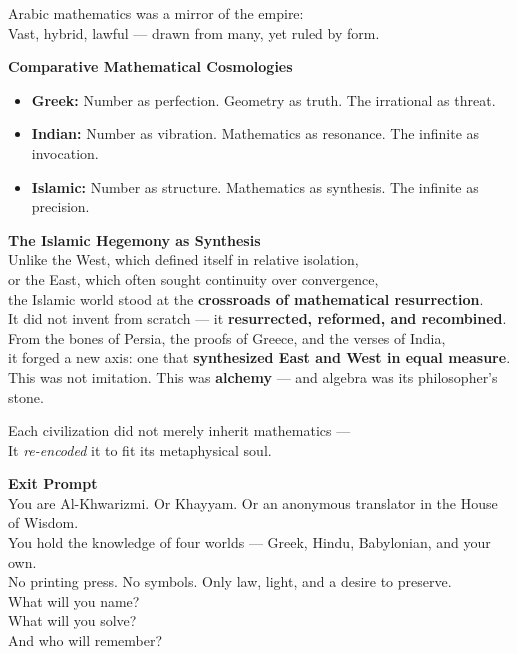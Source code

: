 \documentclass[9pt]{article}
\begin{document}
Arabic mathematics was a mirror of the empire: \\
Vast, hybrid, lawful — drawn from many, yet ruled by form.

\vspace{1em}

\textbf{Comparative Mathematical Cosmologies} \\

\begin{itemize}
    \item \textbf{Greek:} Number as perfection. Geometry as truth. The irrational as threat.
    \item \textbf{Indian:} Number as vibration. Mathematics as resonance. The infinite as invocation.
    \item \textbf{Islamic:} Number as structure. Mathematics as synthesis. The infinite as precision.
\end{itemize}

\vspace{1em}

\textbf{The Islamic Hegemony as Synthesis} \\

Unlike the West, which defined itself in relative isolation, \\
or the East, which often sought continuity over convergence, \\
the Islamic world stood at the \textbf{crossroads of mathematical resurrection}. \\

It did not invent from scratch — it \textbf{resurrected, reformed, and recombined}. \\

From the bones of Persia, the proofs of Greece, and the verses of India, \\
it forged a new axis: one that \textbf{synthesized East and West in equal measure}. \\

This was not imitation. This was \textbf{alchemy} — and algebra was its philosopher’s stone.

Each civilization did not merely inherit mathematics — \\
It \textit{re-encoded} it to fit its metaphysical soul.

\newpage

\textbf{Exit Prompt} \\

You are Al-Khwarizmi. Or Khayyam. Or an anonymous translator in the House of Wisdom. \\

You hold the knowledge of four worlds — Greek, Hindu, Babylonian, and your own. \\

No printing press. No symbols. Only law, light, and a desire to preserve. \\

What will you name? \\
What will you solve? \\
And who will remember?
\end{document}
